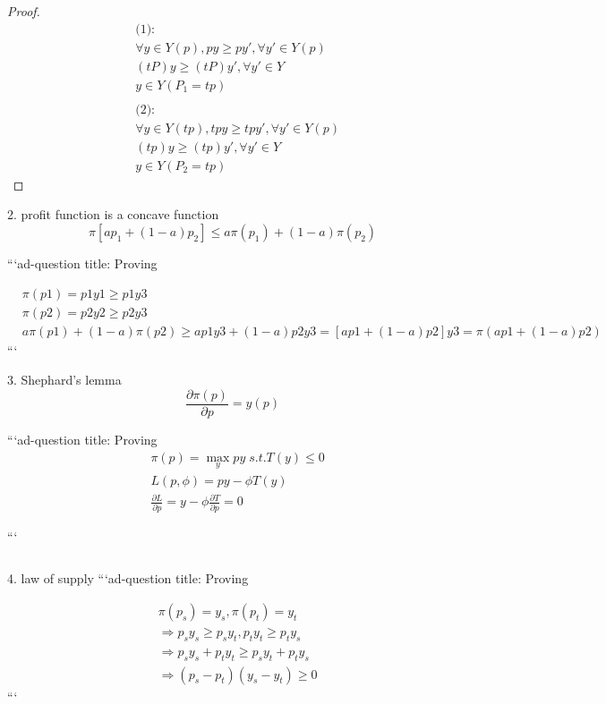 \documentclass{article}
\begin{document}
\begin{proof}
\begin{align}
&\text{(1):}
\\& \forall y \in Y(p), py \geqslant py',\forall y' \in Y(p)
\\&(tP)y\geqslant (tP)y',\forall y' \in Y
\\&y\in Y(P_{1}=tp)
\\&
\\&\text{(2):}
\\&\forall y \in Y(tp), tpy \geqslant tpy',\forall y' \in Y(p)
\\&(tp)y\geqslant (tp)y',\forall y' \in Y
\\&y\in Y(P_{2}=tp)
\end{align}
\end{proof}

2.
profit function is a concave function
$$\pi[ap_{1}+(1-a)p_{2}]\leqslant a\pi(p_{1})+(1-a)\pi(p_{2})$$

```ad-question
title: Proving

\begin{align}
&\pi(p1)=p1y1\ge p1y3
\\&\pi(p2)=p2y2 \ge p2y3
\\&a \pi(p1)+(1-a)\pi(p2)\ge ap1y3+(1-a)p2y3=[ap1+(1-a)p2]y3=\pi(ap1+(1-a)p2)
\end{align}
```

3.
Shephard's lemma
$$\frac{\partial \pi(p)}{\partial p }=y(p)$$

```ad-question
title: Proving
\begin{align}
&\pi(p)=\mathop{max}\limits_{y} py \; s.t. T(y)\leqslant 0
\\&L(p,\phi)=py-\phi T(y)
\\&\frac{\partial L}{\partial p}=y-\phi \frac{\partial T}{\partial p}=0
\end{align}

```

$$$$

4.
law of supply
```ad-question
title: Proving

\begin{align}
&\pi(p_{s})=y_{s},\pi(p_{t})=y_{t}
\\&\Rightarrow p_{s}y_{s}\ge p_{s}y_{t},p_{t}y_{t}\ge p_{t}y_{s}
\\& \Rightarrow p_{s}y_{s}+p_{t}y_{t}\ge p_{s}y_{t}+p_{t}y_{s}
\\&\Rightarrow (p_{s}-p_{t})(y_{s}-y_{t})\ge 0
\end{align}
```
\end{document}
